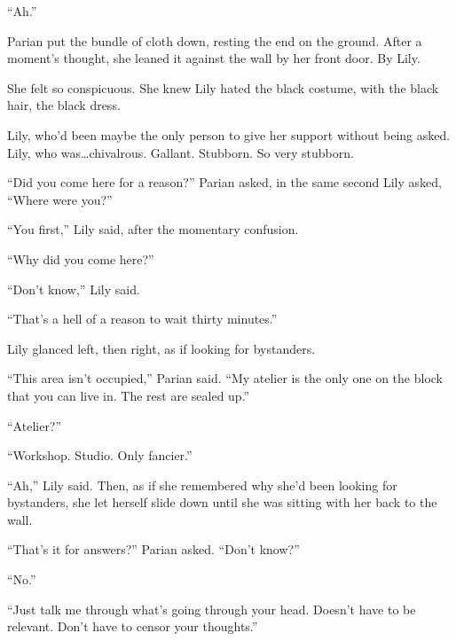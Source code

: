 ``Ah.''



Parian put the bundle of cloth down, resting the end on the ground.  After a moment's thought, she leaned it against the wall by her front door.  By Lily.



She felt so conspicuous.  She knew Lily hated the black costume, with the black hair, the black dress.



Lily, who'd been maybe the only person to give her support without being asked.  Lily, who was\ldots chivalrous.  Gallant.  Stubborn.  So very stubborn.



``Did you come here for a reason?''  Parian asked, in the same second Lily asked, ``Where were you?''



``You first,'' Lily said, after the momentary confusion.



``Why did you come here?''



``Don't know,'' Lily said.



``That's a hell of a reason to wait thirty minutes.''



Lily glanced left, then right, as if looking for bystanders.



``This area isn't occupied,'' Parian said.  ``My atelier is the only one on the block that you can live in.  The rest are sealed up.''



``Atelier?''



``Workshop.  Studio.  Only fancier.''



``Ah,'' Lily said.  Then, as if she remembered why she'd been looking for bystanders, she let herself slide down until she was sitting with her back to the wall.



``That's it for answers?'' Parian asked.  ``Don't know?''



``No.''



``Just talk me through what's going through your head.  Doesn't have to be relevant.  Don't have to censor your thoughts.''




